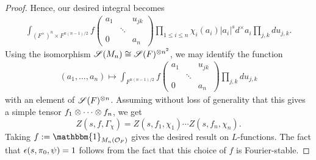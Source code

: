 \documentclass[11pt]{article}
\newcommand{\ind}{\mathbbm{1}}
\renewcommand{\S}{\mathscr{S}}
\begin{document}
\begin{proof}
Hence, our desired integral becomes
\begin{align*}
\int_{(F^{\times})^n\times F^{n(n-1)/2}}f\begin{pmatrix}
a_1 & & u_{jk} \\
& \ddots & \\
0 & & a_n
\end{pmatrix}\prod_{1\leq i\leq n}\chi_i(a_i)|a_i|^sd^{\times}a_i\prod_{j,k}du_{j,k}.
\end{align*}
Using the isomorphism $\S(M_n)\iso\S(F)^{\tensor n^2}$, we may identify the function 
\begin{align*}
(a_1,\ldots,a_n)\mapsto\int_{F^{n(n-1)/2}}f\begin{pmatrix}
a_1 & & u_{jk} \\
& \ddots & \\
0 & & a_n
\end{pmatrix}\prod_{j,k}du_{j,k}
\end{align*}
with an element of $\S(F)^{\tensor n}$. Assuming without loss of generality that this gives a simple tensor $f_1\otimes\cdots\otimes f_n$, we get 
$$Z(s,f,\Gamma_{\chi})=Z(s,f_1,\chi_1)\cdots Z(s,f_n,\chi_n).$$
Taking $f:=\ind_{M_n(\O_F)}$ gives the desired result on $L$-functions. The fact that $\epsilon(s,\pi_0,\psi)=1$ follows from the fact that this choice of $f$ is Fourier-stable.
\end{proof}
\end{document}
